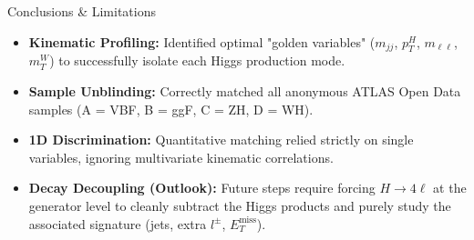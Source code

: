 \begin{frame}{Conclusions \& Limitations}
    
    \vspace{-0.1cm}
    \begin{tcolorbox}[
        colback=green!5!white, 
        colframe=green!60!black, 
        title=Successes \& Key Results,
        boxsep=1pt, top=2pt, bottom=2pt, left=4pt, right=4pt
    ]
        \small
        \begin{itemize}
            \setlength{\itemsep}{0.1cm} %
            \item[\checkmark] \textbf{Kinematic Profiling:} Identified optimal "golden variables" ($m_{jj}$, $p_T^H$, $m_{\ell\ell}$, $m_T^W$) to successfully isolate each Higgs production mode.
            \item[\checkmark] \textbf{Sample Unblinding:} Correctly matched all anonymous ATLAS Open Data samples (A = VBF, B = ggF, C = ZH, D = WH).
        \end{itemize}
    \end{tcolorbox}
    
    \vspace{0.1cm}
    
    \begin{tcolorbox}[
        colback=red!5!white, 
        colframe=red!70!black, 
        title=Current Limitations \& Future Outlook,
        boxsep=1pt, top=2pt, bottom=2pt, left=4pt, right=4pt
    ]
        \small
        \begin{itemize}
            \setlength{\itemsep}{0.1cm}
            \item[!] \textbf{1D Discrimination:} Quantitative matching relied strictly on single variables, ignoring multivariate kinematic correlations.
            \item[!] \textbf{Decay Decoupling (Outlook):} Future steps require forcing $H \to 4\ell$ at the generator level to cleanly subtract the Higgs products and purely study the associated signature (jets, extra $l^\pm$, $E_T^{\text{miss}}$).
        \end{itemize}
    \end{tcolorbox}
    
\end{frame}